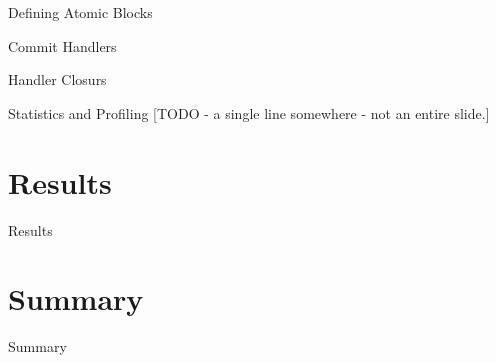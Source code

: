 \documentclass[]{beamer}
\begin{document}
\begin{frame}{Defining Atomic Blocks}
\end{frame}

\begin{frame}{Commit Handlers}
\end{frame}

\begin{frame}{Handler Closurs}
\end{frame}

\begin{frame}{Statistics and Profiling}
[TODO - a single line somewhere - not an entire slide.]
\end{frame}

\section{Results}

\begin{frame}{Results}
\end{frame}

\section{Summary}

\begin{frame}{Summary}
\end{frame}
\end{document}
